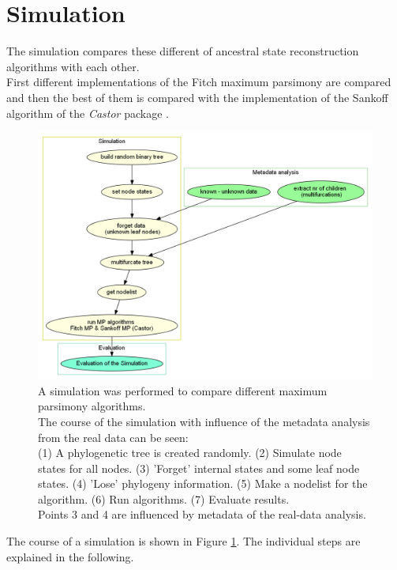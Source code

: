   \section{Simulation}\label{sec:simulation}
    The simulation compares these different of ancestral state reconstruction algorithms with each 
      other. \\
    First different implementations of the Fitch maximum parsimony are compared and then the best of 
      them is compared with the implementation of the Sankoff algorithm of the \textit{Castor} package 
      \cite{Louca2017}. \\

    \begin{figure}[h!]
      \centering
      \includegraphics[width=1\textwidth]{Figures/Workflow-Simulation.png}
      \caption{A simulation was performed to compare different maximum parsimony algorithms. \\
        The course of the simulation with influence of the metadata analysis from the real data can
          be seen: \\
        (1) A phylogenetic tree is created randomly. (2) Simulate node states for all nodes. (3) 
          'Forget' internal states and some leaf node states. (4) 'Lose' phylogeny information. (5) 
          Make a nodelist for the algorithm. (6) Run algorithms. (7) Evaluate results. \\
        Points 3 and 4 are influenced by metadata of the real-data analysis.}
      \label{fig:Simulation Workflow}
    \end{figure}
    The course of a simulation is shown in Figure \ref{fig:Simulation Workflow}. The individual steps 
      are explained in the following. \\

